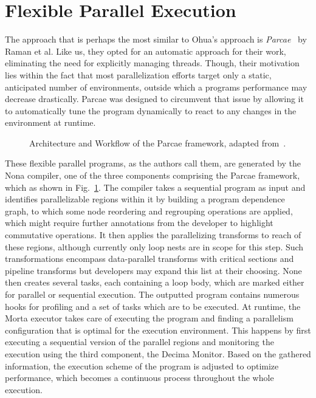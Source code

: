 \section{Flexible Parallel Execution}%
\label{sec:related:parcae}
The approach that is perhaps the most similar to Ohua's approach is \emph{Parcae}~\cite{raman2012parcae} by Raman et al.
Like us, they opted for an automatic approach for their work, eliminating the need for explicitly managing threads.
Though, their motivation lies within the fact that most parallelization efforts target only a static, anticipated number of environments, outside which a programs performance may decrease drastically.
Parcae was designed to circumvent that issue by allowing it to automatically tune the program dynamically to react to any changes in the environment at runtime.

\begin{figure}[b]
    \caption{Architecture and Workflow of the Parcae framework, adapted from~\cite{raman2012parcae}.}%
    \label{fig:related:parcae}
\end{figure}

These flexible parallel programs, as the authors call them, are generated by the Nona compiler, one of the three components comprising the Parcae framework, which as shown in Fig.~\ref{fig:related:parcae}.
The compiler takes a sequential program as input and identifies parallelizable regions within it by building a program dependence graph, to which some node reordering and regrouping operations are applied, which might require further annotations from the developer to highlight commutative operations.
It then applies the parallelizing transforms to reach of these regions, although currently only loop nests are in scope for this step.
Such transformations encompass data-parallel transforms with critical sections and pipeline transforms but developers may expand this list at their choosing.
None then creates several tasks, each containing a loop body, which are marked either for parallel or sequential execution.
The outputted program contains numerous hooks for profiling and a set of tasks which are to be executed.
At runtime, the Morta executor takes care of executing the program and finding a parallelism configuration that is optimal for the execution environment.
This happens by first executing a sequential version of the parallel regions and monitoring the execution using the third component, the Decima Monitor.
Based on the gathered information, the execution scheme of the program is adjusted to optimize performance, which becomes a continuous process throughout the whole execution.

